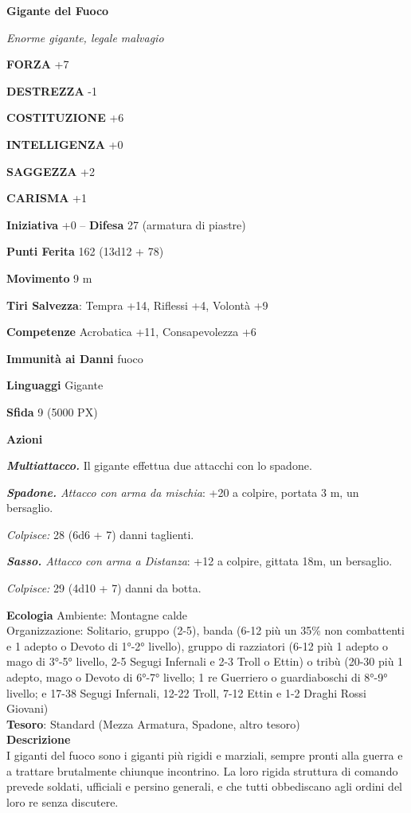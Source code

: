 \begin{multicols}{2}
\medskip{}\textbf{Gigante del Fuoco}

\textit{Enorme gigante, legale malvagio}

\textbf{FORZA} +7

\textbf{DESTREZZA} -1

\textbf{COSTITUZIONE} +6

\textbf{INTELLIGENZA} +0

\textbf{SAGGEZZA} +2

\textbf{CARISMA} +1

\textbf{Iniziativa} +0 -- \textbf{Difesa} 27 (armatura di piastre)

\textbf{Punti Ferita} 162 (13d12 + 78)

\textbf{Movimento} 9 m

\textbf{Tiri Salvezza}: Tempra +14, Riflessi +4, Volontà +9

\textbf{Competenze} Acrobatica +11, Consapevolezza +6

\textbf{Immunità ai Danni} fuoco

\textbf{Linguaggi} Gigante

\textbf{Sfida} 9 (5000 PX)

\textbf{Azioni}

\textit{\textbf{Multiattacco.}} Il gigante effettua due attacchi con lo spadone.

\textit{\textbf{Spadone.} Attacco con arma da mischia}: +20 a colpire, portata 3 m, un bersaglio.

\textit{Colpisce:} 28 (6d6 + 7) danni taglienti.

\textit{\textbf{Sasso.} Attacco con arma a Distanza}: +12 a colpire, gittata 18m, un bersaglio.

\textit{Colpisce:} 29 (4d10 + 7) danni da botta.

\textbf{Ecologia}
Ambiente: Montagne calde\\
Organizzazione: Solitario, gruppo (2-5), banda (6-12 più un 35\% non combattenti e 1 adepto o Devoto di 1°-2° livello), gruppo di razziatori (6-12 più 1 adepto o mago di 3°-5° livello, 2-5 Segugi Infernali e 2-3 Troll o Ettin) o tribù (20-30 più 1 adepto, mago o Devoto di 6°-7° livello; 1 re Guerriero o guardiaboschi di 8°-9° livello; e 17-38 Segugi Infernali, 12-22 Troll, 7-12 Ettin e 1-2 Draghi Rossi Giovani)\\
\textbf{Tesoro}: Standard (Mezza Armatura, Spadone, altro tesoro)\\
\textbf{Descrizione}\\
I giganti del fuoco sono i giganti più rigidi e marziali, sempre pronti alla guerra e a trattare brutalmente chiunque incontrino. La loro rigida struttura di comando prevede soldati, ufficiali e persino generali, e che tutti obbediscano agli ordini del loro re senza discutere.


\end{multicols}
